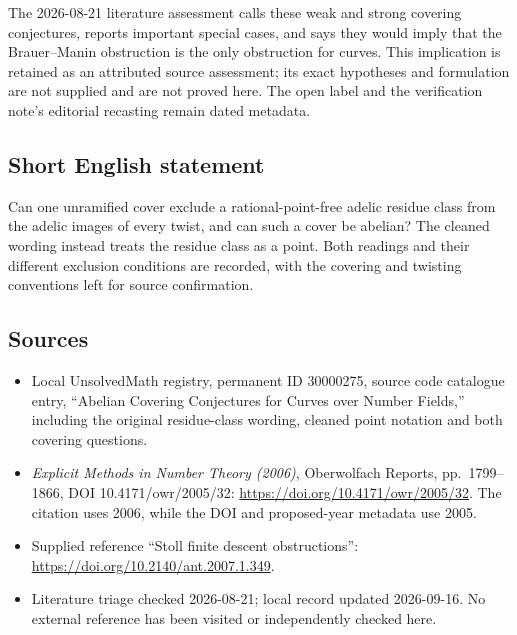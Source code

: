 \documentclass[11pt]{article}
\begin{document}
The 2026-08-21 literature assessment calls these weak and strong covering conjectures, reports important special cases, and says they would imply that the Brauer--Manin obstruction is the only obstruction for curves. This implication is retained as an attributed source assessment; its exact hypotheses and formulation are not supplied and are not proved here. The open label and the verification note's editorial recasting remain dated metadata.
\subsection{Short English statement}
Can one unramified cover exclude a rational-point-free adelic residue class from the adelic images of every twist, and can such a cover be abelian? The cleaned wording instead treats the residue class as a point. Both readings and their different exclusion conditions are recorded, with the covering and twisting conventions left for source confirmation.
\subsection{Sources}
\begin{itemize}
\item Local UnsolvedMath registry, permanent ID 30000275, source code catalogue entry, ``Abelian Covering Conjectures for Curves over Number Fields,'' including the original residue-class wording, cleaned point notation and both covering questions.
\item \emph{Explicit Methods in Number Theory (2006)}, Oberwolfach Reports, pp.\ 1799--1866, DOI 10.4171/owr/2005/32: \url{https://doi.org/10.4171/owr/2005/32}. The citation uses 2006, while the DOI and proposed-year metadata use 2005.
\item Supplied reference ``Stoll finite descent obstructions'': \url{https://doi.org/10.2140/ant.2007.1.349}.
\item Literature triage checked 2026-08-21; local record updated 2026-09-16. No external reference has been visited or independently checked here.
\end{itemize}
\end{document}
